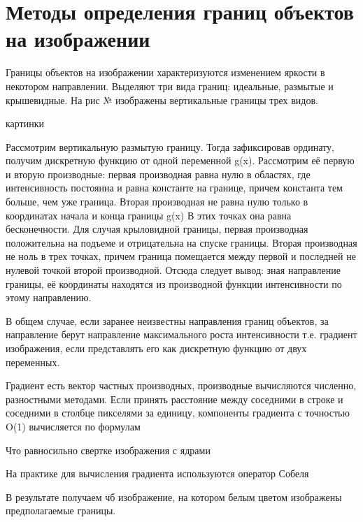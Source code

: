 \documentclass[oneside,final,14pt]{extreport}
\begin{document}
	
\chapter{Методы определения границ объектов на изображении}

Границы объектов на изображении характеризуются изменением яркости в некотором направлении. Выделяют три вида границ: идеальные,  размытые  и крышевидные. На рис № изображены вертикальные границы трех видов.

картинки

Рассмотрим вертикальную размытую границу. Тогда зафиксировав ординату, получим дискретную функцию от одной переменной g(x). Рассмотрим её первую и вторую производные: первая производная равна нулю в областях, где интенсивность постоянна и равна константе на границе, причем константа тем больше, чем уже граница. Вторая производная не равна нулю только в координатах начала и конца границы g(x) В этих точках она равна бесконечности. Для случая крыловидной границы, первая производная положительна на подъеме и отрицательна на спуске границы. Вторая производная не ноль в трех точках, причем граница помещается между первой и последней не нулевой точкой второй производной. Отсюда следует вывод: зная направление границы, её координаты находятся из производной функции интенсивности по этому направлению. 
 
В общем случае, если заранее неизвестны направления границ объектов, за направление берут направление максимального роста интенсивности  т.е. градиент изображения, если представлять его как дискретную функцию от двух переменных. 

Градиент есть вектор частных производных, производные вычисляются численно, разностными методами. Если принять расстояние между соседними в строке и соседними в столбце пикселями за единицу, компоненты градиента с точностью O(1) вычисляется по формулам

Что равносильно свертке изображения с ядрами 

На практике для вычисления градиента используются оператор Собеля

В результате получаем чб изображение, на котором белым цветом изображены предполагаемые границы.
\end{document}
